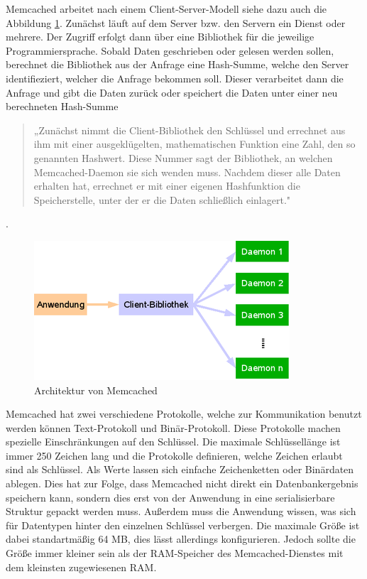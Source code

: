 Memcached arbeitet nach einem Client-Server-Modell siehe dazu auch die
Abbildung \ref{fig:memcached-architecture}. Zunächst läuft auf dem
Server bzw. den Servern ein Dienst oder mehrere. Der Zugriff erfolgt dann über
eine Bibliothek für die jeweilige Programmiersprache. Sobald Daten geschrieben
oder gelesen werden sollen, berechnet die Bibliothek aus der Anfrage eine
Hash-Summe, welche den Server identifieziert, welcher die Anfrage bekommen
soll. Dieser verarbeitet dann die Anfrage und gibt die Daten zurück oder
speichert die Daten unter einer neu berechneten Hash-Summe 

\begin{quote}
    „Zunächst nimmt die Client-Bibliothek den Schlüssel und errechnet aus ihm
    mit einer ausgeklügelten, mathematischen Funktion eine Zahl, den so
    genannten Hashwert. Diese Nummer sagt der Bibliothek, an welchen
    Memcached-Daemon sie sich wenden muss. Nachdem dieser alle Daten erhalten
    hat, errechnet er mit einer eigenen Hashfunktion die Speicherstelle, unter
    der er die Daten schließlich einlagert." \cite{Schuermann2009} 
\end{quote}
.

\begin{figure}
\centering
\includegraphics{images/memcached_illustration_large.png}
\caption{Architektur von Memcached \cite{Schuermann2009}}
\label{fig:memcached-architecture}
\end{figure}

Memcached hat zwei verschiedene Protokolle, welche zur Kommunikation benutzt
werden können Text-Protokoll und Binär-Protokoll. Diese Protokolle machen
spezielle Einschränkungen auf den Schlüssel. Die maximale Schlüssellänge ist
immer 250 Zeichen lang und die Protokolle definieren, welche Zeichen erlaubt
sind als Schlüssel. Als Werte lassen sich einfache Zeichenketten oder
Binärdaten ablegen. Dies hat zur Folge, dass Memcached nicht direkt ein
Datenbankergebnis speichern kann, sondern dies erst von der Anwendung in eine
serialisierbare Struktur gepackt werden muss. Außerdem muss die Anwendung
wissen, was sich für Datentypen hinter den einzelnen Schlüssel verbergen.
Die maximale Größe ist dabei standartmäßig 64 MB, dies lässt allerdings
konfigurieren. Jedoch sollte die Größe immer kleiner sein als
der \gls{RAM}-Speicher des Memcached-Dienstes mit dem kleinsten
zugewiesenen \gls{RAM}.
